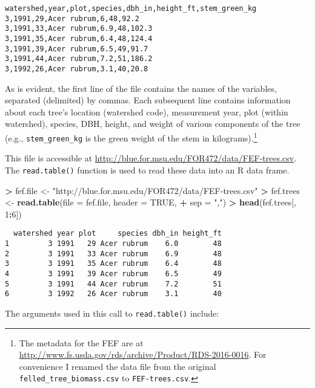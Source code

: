 \documentclass[]{krantz}
\makeatletter
\newenvironment{Shaded}{\begin{snugshade}}{\end{snugshade}}
\newcommand{\KeywordTok}[1]{\textcolor[rgb]{0.27,0.27,0.27}{\textbf{#1}}}
\newcommand{\DataTypeTok}[1]{\textcolor[rgb]{0.27,0.27,0.27}{#1}}
\newcommand{\DecValTok}[1]{\textcolor[rgb]{0.06,0.06,0.06}{#1}}
\newcommand{\StringTok}[1]{\textcolor[rgb]{0.5,0.5,0.5}{#1}}
\newcommand{\OtherTok}[1]{\textcolor[rgb]{0.37,0.37,0.37}{#1}}
\newcommand{\OperatorTok}[1]{\textcolor[rgb]{0.43,0.43,0.43}{\textbf{#1}}}
\newcommand{\NormalTok}[1]{#1}
\newenvironment{kframe}{%
\medskip{}
\setlength{\fboxsep}{.8em}
 \def\at@end@of@kframe{}%
 \ifinner\ifhmode%
  \def\at@end@of@kframe{\end{minipage}}%
  \begin{minipage}{\columnwidth}%
 \fi\fi%
 \def\FrameCommand##1{\hskip\@totalleftmargin \hskip-\fboxsep
 \colorbox{shadecolor}{##1}\hskip-\fboxsep
     \hskip-\linewidth \hskip-\@totalleftmargin \hskip\columnwidth}%
 \MakeFramed {\advance\hsize-\width
   \@totalleftmargin\z@ \linewidth\hsize
   \@setminipage}}%
 {\par\unskip\endMakeFramed%
 \at@end@of@kframe}
\renewenvironment{Shaded}{\begin{kframe}}{\end{kframe}}
\theoremstyle{definition}
\theoremstyle{definition}
\theoremstyle{definition}
\theoremstyle{remark}
\makeatother
\begin{document}
\begin{verbatim}
watershed,year,plot,species,dbh_in,height_ft,stem_green_kg
3,1991,29,Acer rubrum,6,48,92.2
3,1991,33,Acer rubrum,6.9,48,102.3
3,1991,35,Acer rubrum,6.4,48,124.4
3,1991,39,Acer rubrum,6.5,49,91.7
3,1991,44,Acer rubrum,7.2,51,186.2
3,1992,26,Acer rubrum,3.1,40,20.8
\end{verbatim}

As is evident, the first line of the file contains the names of the
variables, separated (delimited) by commas. Each subsequent line
contains information about each tree's location (watershed code),
measurement year, plot (within watershed), species, DBH, height, and
weight of various components of the tree (e.g., \texttt{stem\_green\_kg}
is the green weight of the stem in kilograms).\footnote{The metadata for
  the FEF are at
  \url{http://www.fs.usda.gov/rds/archive/Product/RDS-2016-0016}. For
  convenience I renamed the data file from the original
  \texttt{felled\_tree\_biomass.csv} to \texttt{FEF-trees.csv}.}

This file is accessible at
\url{http://blue.for.msu.edu/FOR472/data/FEF-trees.csv}. The
\texttt{read.table()} function is used to read these data into an R data
frame.

\begin{Shaded}
\begin{Highlighting}[]
\OperatorTok{>}\StringTok{ }\NormalTok{fef.file <-}\StringTok{ "http://blue.for.msu.edu/FOR472/data/FEF-trees.csv"}
\OperatorTok{>}\StringTok{ }\NormalTok{fef.trees <-}\StringTok{ }\KeywordTok{read.table}\NormalTok{(}\DataTypeTok{file =}\NormalTok{ fef.file, }\DataTypeTok{header =} \OtherTok{TRUE}\NormalTok{, }
\OperatorTok{+}\StringTok{   }\DataTypeTok{sep =} \StringTok{","}\NormalTok{)}
\OperatorTok{>}\StringTok{ }\KeywordTok{head}\NormalTok{(fef.trees[, }\DecValTok{1}\OperatorTok{:}\DecValTok{6}\NormalTok{])}
\end{Highlighting}
\end{Shaded}

\begin{verbatim}
  watershed year plot     species dbh_in height_ft
1         3 1991   29 Acer rubrum    6.0        48
2         3 1991   33 Acer rubrum    6.9        48
3         3 1991   35 Acer rubrum    6.4        48
4         3 1991   39 Acer rubrum    6.5        49
5         3 1991   44 Acer rubrum    7.2        51
6         3 1992   26 Acer rubrum    3.1        40
\end{verbatim}

The arguments used in this call to \texttt{read.table()} include:
\end{document}
